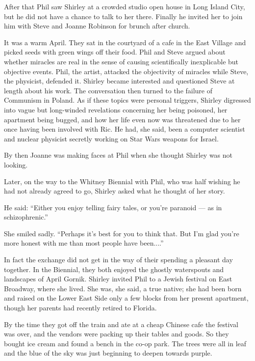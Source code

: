\documentclass[english,11pt,letterpaper,onecolumn]{scrbook}
\begin{document}
After that Phil saw Shirley at a crowded studio open house in Long Island City, but he did not have a chance to talk to her there.  Finally he invited her to join him with Steve and Joanne Robinson for brunch after church.

It was a warm April.  They sat in the courtyard of a cafe in the East Village and picked seeds with green wings off their food.  Phil and Steve argued about whether miracles are real in the sense of causing scientifically inexplicable but objective events.  Phil, the artist, attacked the objectivity of miracles while Steve, the physicist, defended it.  Shirley became interested and questioned Steve at length about his work.  The conversation then turned to the failure of Communism in Poland.  As if these topics were personal triggers, Shirley digressed into vague but long-winded revelations concerning her being poisoned, her apartment being bugged, and how her life even now was threatened due to her once having been involved with Ric.  He had, she said, been a computer scientist and nuclear physicist secretly working on Star Wars weapons for Israel.

By then Joanne was making faces at Phil when she thought Shirley was not looking.    

Later, on the way to the Whitney Biennial with Phil, who was half wishing he had not already agreed to go, Shirley asked what he thought of her story.  

He said:  ``Either you enjoy telling fairy tales, or you're paranoid --- as in schizophrenic.'' 

She smiled sadly.  ``Perhaps it's best for you to think that.  But I'm glad you're more honest with me than most people have been....''

In fact the exchange did not get in the way of their spending a pleasant day together.  In the Biennial, they both enjoyed the ghostly waterspouts and landscapes of April Gornik.  Shirley invited Phil to a Jewish festival on East Broadway, where she lived.  She was, she said, a true native; she had been born and raised on the Lower East Side only a few blocks from her present apartment, though her parents had recently retired to Florida.

By the time they got off the train and ate at a cheap Chinese cafe the festival was over, and the vendors were packing up their tables and goods.  So they bought ice cream and found a bench in the co-op park.  The trees were all in leaf and the blue of the sky was just beginning to deepen towards purple.
\end{document}
